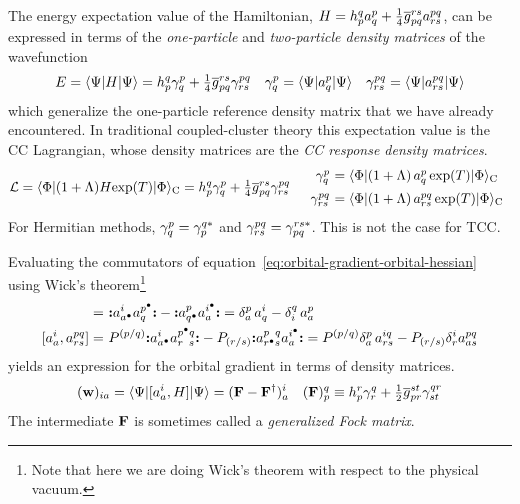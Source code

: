 \documentclass[11pt]{article}
\numberwithin{equation}{section}
\begin{document}
\begin{dfn}
The energy expectation value of the Hamiltonian,
$
  H
=
  h_p^q
  a^p_q
+
  \tfrac{1}{4}
  \overline{g}_{pq}^{rs}
  a^{pq}_{rs}
$,
can be expressed in terms of the \textit{one-particle} and \textit{two-particle density matrices} of the wavefunction
\begin{align}
\label{eq:one-and-two-particle-density-matrices}
  E
=
  \langle\Psi |H|\Psi \rangle
=
  h_p^q
  \gamma ^p_q
+
  \tfrac{1}{4}
  \overline{g}_{pq}^{rs}
  \gamma ^{pq}_{rs}
&&
  \gamma ^p_q
=
  \langle\Psi |a^p_q|\Psi \rangle
&&
  \gamma ^{pq}_{rs}
=
  \langle\Psi |a^{pq}_{rs}|\Psi \rangle
\end{align}
which generalize the one-particle reference density matrix that we have already encountered.
In traditional coupled-cluster theory this expectation value is the CC Lagrangian, whose density matrices are the \textit{CC response density matrices}.
\begin{align}
  \mc{L}
=
  \ip{\F|(1+\La)H\mr{exp}(T)|\F}_\mr{C}
=
  h_p^q
  \g^p_q
+
  \tfr{1}{4}
  \ol{g}_{pq}^{rs}
  \g^{pq}_{rs}
&&
\begin{array}{r@{\ }l}
  \g^p_q
&=
  \ip{\F|(1 + \La)\, a^p_q\,\mr{exp}(T)|\F}_\mr{C}
\\[5pt]
  \g^{pq}_{rs}
&=
  \ip{\F|(1 + \La)\, a^{pq}_{rs}\,\mr{exp}(T)|\F}_\mr{C}
\end{array}
\end{align} 
For Hermitian methods, $\gamma ^p_q=\gamma ^{q*}_{p}$ and $\gamma ^{pq}_{rs}=\gamma ^{rs*}_{pq}$.
This is not the case for TCC.
\end{dfn}


\begin{rmk}
Evaluating the commutators of equation~\ref{eq:orbital-gradient-orbital-hessian} using Wick's theorem\footnote{
  Note that here we are doing Wick's theorem with respect to the physical vacuum.
}
\begin{align}
  [a_a^i, a^p_q]
=&\
  \no{
    a^i_{a^\ptcl}
    a^{p^\ptcl}_q
  }
-
  \no{
    a^p_{q^\ptcl}
    a^{i^\ptcl}_a
  }
=
  \d^p_a\,
  a^i_q
-
  \d^q_i\,
  a^p_a
\\
  [a_a^i, a^{pq}_{rs}]
=&\
  P^{(p/q)}
  \no{
    a^i_{a^\ptcl}
    a^{p^\ptcl q}_{r^{\phantom\ptcl}s}
  }
-
  P_{(r/s)}
  \no{
    a^{p^{\phantom\ptcl}q}_{r^\ptcl s}
    a^{i^\ptcl}_a
  }
=
  P^{(p/q)}
  \d^p_a\,
  a^{iq}_{rs}
-
  P_{(r/s)}
  \d^i_r
  a^{pq}_{as}
\end{align}
yields an expression for the orbital gradient in terms of density matrices.
\begin{align}
  (\mathbf{w})_{ia}
=
  \langle\Psi |[a_a^i, H]|\Psi \rangle
=
  (
    \mathbf{F}
  -
    \mathbf{F}^\dagger
  )_a^i
&&
  (\mathbf{F})_p^q
\equiv
  h_p^r
  \gamma ^q_r
+
  \tfrac{1}{2}
  \overline{g}_{pr}^{st}
  \gamma ^{qr}_{st}
\end{align}
The intermediate $\mathbf{F}$ is sometimes called a \textit{generalized Fock matrix}.
\end{rmk}
\end{document}
